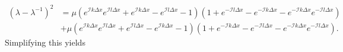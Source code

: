 \begin{equation*}
    \begin{split}
    \left(\lambda - \lambda^{-1}\right)^2 &= \mu \left(e^{\mathcal{I}k \Delta x}e^{\mathcal{I}l \Delta x}+ e^{\mathcal{I}k\Delta x} - e^{\mathcal{I}l \Delta x}-1\right)\left(1+e^{-\mathcal{I}l \Delta x} - e^{-\mathcal{I}k \Delta x}- e^{-\mathcal{I}k \Delta x}e^{-\mathcal{I}l \Delta x}\right) \\ 
    &
    + \mu \left(e^{\mathcal{I}k \Delta x}e^{\mathcal{I}l \Delta x}+ e^{\mathcal{I}l\Delta x} - e^{\mathcal{I}k \Delta x}-1\right)\left(1+e^{-\mathcal{I}k \Delta x} - e^{-\mathcal{I}l \Delta x}- e^{-\mathcal{I}k \Delta x}e^{-\mathcal{I}l \Delta x}\right).
    \end{split}
\end{equation*}
Simplifying this yields 